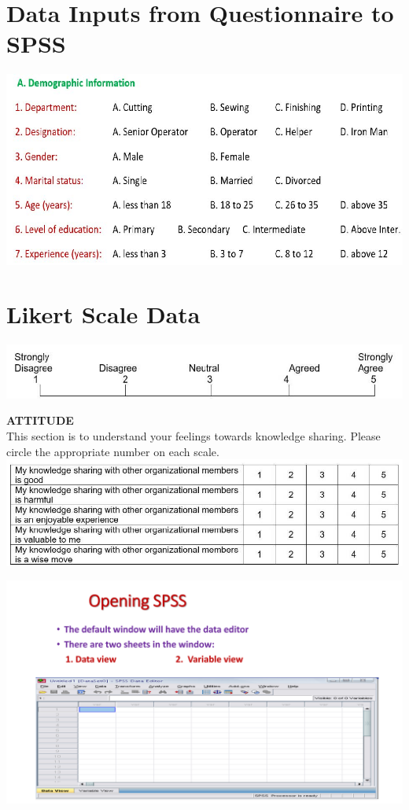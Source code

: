 \documentclass[
  letterpaper,
  DIV=11,
  numbers=noendperiod]{scrreprt}
\begin{document}
\section{Data Inputs from Questionnaire to
SPSS}\label{data-inputs-from-questionnaire-to-spss}

\includegraphics{images/demographic.jpg}

\section{Likert Scale Data}\label{likert-scale-data}

\includegraphics{images/scale.jpg}

\textbf{ATTITUDE}\\
This section is to understand your feelings towards knowledge sharing.
Please circle the appropriate number on each scale.\\

\includegraphics{images/attitude.jpg}

\includegraphics{images/slides/img_Page_013.png}
\end{document}
